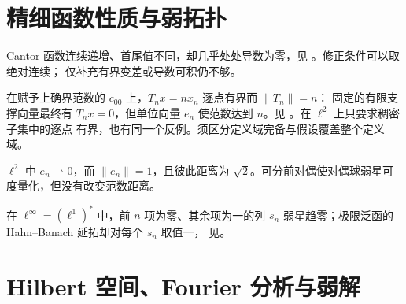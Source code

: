 \section{精细函数性质与弱拓扑}

\begin{description}[leftmargin=2em,style=nextline]
\item[连续且几乎处处导数为零并不蕴含常值。]
Cantor 函数连续递增、首尾值不同，却几乎处处导数为零，见
。修正条件可以取绝对连续；
仅补充有界变差或导数可积仍不够。
\item[逐点有界不在所有定义域上保证一致有界。]
在赋予上确界范数的 \(c_{00}\) 上，\(T_nx=nx_n\) 逐点有界而 \(\|T_n\|=n\)：
固定的有限支撑向量最终有 \(T_nx=0\)，但单位向量 \(e_n\) 使范数达到 \(n\)。见
。在 \(\ell^2\) 上只要求稠密子集中的逐点
有界，也有同一个反例。须区分定义域完备与假设覆盖整个定义域。
\item[对偶球弱星紧致不等于范数紧致。]
\(\ell^2\) 中 \(e_n\rightharpoonup0\)，而 \(\|e_n\|=1\)，且彼此距离为
\(\sqrt2\)。可分前对偶使对偶球弱星可度量化，但没有改变范数距离。
\item[弱星收敛不蕴含弱收敛。]
在 \(\ell^\infty=(\ell^1)^*\) 中，前 \(n\) 项为零、其余项为一的列
\(s_n\) 弱星趋零；极限泛函的 Hahn--Banach 延拓却对每个 \(s_n\) 取值一，
见。
\end{description}

\section{Hilbert 空间、Fourier 分析与弱解}


